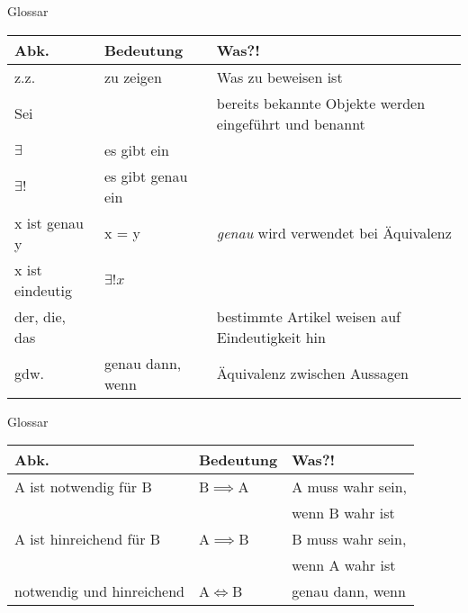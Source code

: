 %
%
%
%

\begin{frame}[fragile]{Glossar}
	\small
	\begin{tabular}{p{} p{} p{}}
		\toprule
		Abk.&Bedeutung&Was?!\\
		\midrule
		z.z. & zu zeigen & Was zu beweisen ist\\
		Sei&&bereits bekannte Objekte werden eingeführt und benannt\\
		$\exists$&es gibt ein&\\
		$\exists !$&es gibt genau ein&\\
		x ist genau y&x = y&\emph{genau} wird verwendet bei Äquivalenz\\
		x ist eindeutig&$\exists ! x$&\\
		der, die, das&&bestimmte Artikel weisen auf Eindeutigkeit hin\\
		gdw.&genau dann, wenn&Äquivalenz zwischen Aussagen\\
		\bottomrule
	\end{tabular}
\end{frame}
\begin{frame}[fragile]{Glossar}
	\small
	\begin{tabular}{p{} p{} p{}}
		\toprule
		Abk.&Bedeutung&Was?!\\
		\midrule
		A ist notwendig für B&B$\implies$A&A muss wahr sein,\\
		&&wenn B wahr ist\\
		A ist hinreichend für B&A$\implies$B&B muss wahr sein,\\
		&&wenn A wahr ist\\
		notwendig und hinreichend&A$\iff$B&genau dann, wenn\\
		\bottomrule
	\end{tabular}
\end{frame}

